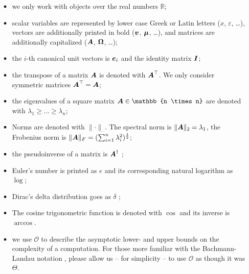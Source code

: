 \begin{itemize}
    \item we only work with objects over the real numbers $\mathbb{R}$;
    \item scalar variables are represented by lower case Greek or Latin letters ($x$, $\varepsilon$, \dots),
          vectors are additionally printed in bold ($\boldsymbol{v}$, $\boldsymbol{\mu}$, \dots),
          and matrices are additionally capitalized ($\boldsymbol{A}$, $\boldsymbol{\Omega}$, \dots);
    \item the $i$-th canonical unit vectors is $\boldsymbol{e}_i$ and the identity matrix $\boldsymbol{I}$;
    \item the transpose of a matrix $\boldsymbol{A}$ is denoted with $\boldsymbol{A}^{\top}$.
          We only consider symmetric matrices $\boldsymbol{A}^{\top} = \boldsymbol{A}$;
    \item the eigenvalues of a square matrix $\mtx{A} \in \mathbb{n \times n}$
          are denoted with $\lambda_1 \geq \dots \geq \lambda_n$;
    \item Norms are denoted with $\lVert \cdot \rVert _{\cdot}$. The spectral norm is
          $\lVert \boldsymbol{A} \rVert _2 = \lambda_1$, the Frobenius norm
          is $\lVert \boldsymbol{A} \rVert _F = (\sum_{i=1}^{n} \lambda_i^2)^{\frac{1}{2}}$;
    \item the pseudoinverse of a matrix is $\boldsymbol{A}^{\dagger}$ \cite{penrose1955pseudo};
    \item Euler's number is printed as $e$ and its corresponding natural logarithm as $\log$;
    \item Dirac's delta distribution goes as $\delta$ \cite[Chapter~15]{dirac1947quantum}; %
    \item The cosine trigonometric function is denoted with $\cos$ and its inverse is $\arccos$.
    \item we use $\mathcal{O}$ to describe the asymptotic lower- and upper bounds
          on the complexity of a computation. For those more familiar with the
          Bachmann-Landau notation \cite[Section~3.2]{cormen2009algorithms},
          please allow us -- for simplicity -- to use $\mathcal{O}$ as though it was $\Theta$.
\end{itemize}
